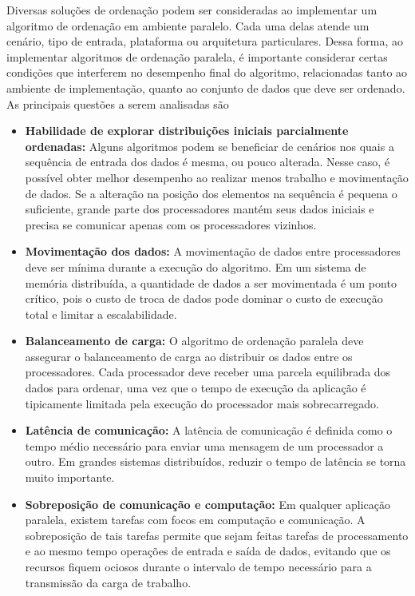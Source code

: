 Diversas soluções de ordenação podem ser consideradas ao implementar um algoritmo de ordenação em ambiente paralelo. Cada uma delas atende um cenário, tipo de entrada, plataforma ou arquitetura particulares. Dessa forma, ao implementar algoritmos de ordenação paralela, é importante considerar certas condições que interferem no desempenho final do algoritmo, relacionadas tanto ao ambiente de implementação, quanto ao conjunto de dados que deve ser ordenado. As principais questões a serem analisadas são \cite{Kale:2010} 
\begin{itemize}
\item \textbf{Habilidade de explorar distribuições iniciais parcialmente ordenadas:}
Alguns algoritmos podem se beneficiar de cenários nos quais a sequência de entrada dos dados é mesma, ou pouco alterada. Nesse caso, é possível obter melhor desempenho ao realizar menos trabalho e movimentação de dados.
Se a alteração na posição dos elementos na sequência é pequena o suficiente, grande parte dos processadores mantém seus dados iniciais e precisa se comunicar apenas com os processadores vizinhos.

\item \textbf{Movimentação dos dados:}
A movimentação de dados entre processadores deve ser mínima durante a execução do algoritmo. Em um sistema de memória distribuída, a quantidade de dados a ser movimentada é um ponto crítico, pois o custo de troca de dados pode dominar o custo de execução total e limitar a escalabilidade.

\item \textbf{Balanceamento de carga:}
O algoritmo de ordenação paralela deve assegurar o balanceamento de carga ao distribuir os dados entre os processadores. Cada processador deve receber uma parcela equilibrada dos dados para ordenar, uma vez que o tempo de execução da aplicação é tipicamente limitada pela execução do processador mais sobrecarregado.

\item \textbf{Latência de comunicação:}
A latência de comunicação é definida como o tempo médio necessário para enviar uma mensagem de um processador a outro.
Em grandes sistemas distribuídos, reduzir o tempo de latência se torna muito importante.

\item \textbf{Sobreposição de comunicação e computação:}
Em qualquer aplicação paralela, existem tarefas com focos em computação e comunicação. A sobreposição de tais tarefas permite que sejam feitas tarefas de processamento e ao mesmo tempo operações de entrada e saída de dados, evitando que os recursos fiquem ociosos durante o intervalo de tempo necessário para a transmissão da carga de trabalho.

\end{itemize}


